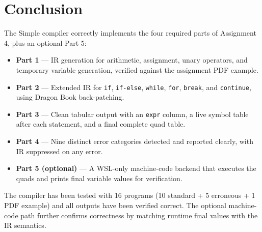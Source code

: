 \documentclass[11pt]{article}
\begin{document}

\section{Conclusion}

The Simple compiler correctly implements the four required parts of Assignment 4, plus an optional Part 5:

\begin{itemize}
    \item \textbf{Part 1} --- IR generation for arithmetic, assignment, unary operators, and temporary variable generation, verified against the assignment PDF example.
    \item \textbf{Part 2} --- Extended IR for \texttt{if}, \texttt{if-else}, \texttt{while}, \texttt{for}, \texttt{break}, and \texttt{continue}, using Dragon Book back-patching.
    \item \textbf{Part 3} --- Clean tabular output with an \texttt{expr} column, a live symbol table after each statement, and a final complete quad table.
    \item \textbf{Part 4} --- Nine distinct error categories detected and reported clearly, with IR suppressed on any error.
    \item \textbf{Part 5 (optional)} --- A WSL-only machine-code backend that executes the quads and prints final variable values for verification.
\end{itemize}

The compiler has been tested with 16 programs (10 standard + 5 erroneous + 1 PDF example) and all outputs have been verified correct. The optional machine-code path further confirms correctness by matching runtime final values with the IR semantics.
\end{document}
